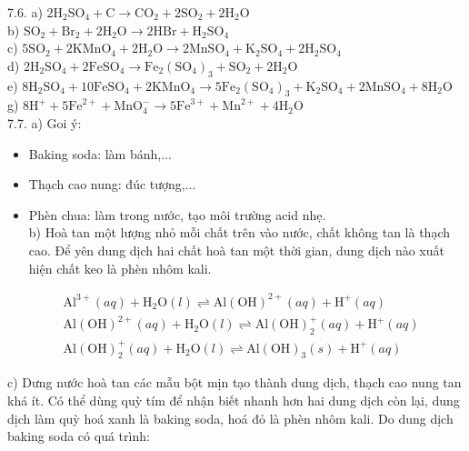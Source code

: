 \documentclass[10pt]{article}
\begin{document}
7.6. a) $2 \mathrm{H}_{2} \mathrm{SO}_{4}+\mathrm{C} \rightarrow \mathrm{CO}_{2}+2 \mathrm{SO}_{2}+2 \mathrm{H}_{2} \mathrm{O}$\\
b) $\mathrm{SO}_{2}+\mathrm{Br}_{2}+2 \mathrm{H}_{2} \mathrm{O} \rightarrow 2 \mathrm{HBr}+\mathrm{H}_{2} \mathrm{SO}_{4}$\\
c) $5 \mathrm{SO}_{2}+2 \mathrm{KMnO}_{4}+2 \mathrm{H}_{2} \mathrm{O} \rightarrow 2 \mathrm{MnSO}_{4}+\mathrm{K}_{2} \mathrm{SO}_{4}+2 \mathrm{H}_{2} \mathrm{SO}_{4}$\\
d) $2 \mathrm{H}_{2} \mathrm{SO}_{4}+2 \mathrm{FeSO}_{4} \rightarrow \mathrm{Fe}_{2}\left(\mathrm{SO}_{4}\right)_{3}+\mathrm{SO}_{2}+2 \mathrm{H}_{2} \mathrm{O}$\\
e) $8 \mathrm{H}_{2} \mathrm{SO}_{4}+10 \mathrm{FeSO}_{4}+2 \mathrm{KMnO}_{4} \rightarrow 5 \mathrm{Fe}_{2}\left(\mathrm{SO}_{4}\right)_{3}+\mathrm{K}_{2} \mathrm{SO}_{4}+2 \mathrm{MnSO}_{4}+8 \mathrm{H}_{2} \mathrm{O}$\\
g) $8 \mathrm{H}^{+}+5 \mathrm{Fe}^{2+}+\mathrm{MnO}_{4}^{-} \rightarrow 5 \mathrm{Fe}^{3+}+\mathrm{Mn}^{2+}+4 \mathrm{H}_{2} \mathrm{O}$\\
7.7. a) Goi ý:

\begin{itemize}
  \item Baking soda: làm bánh,...
  \item Thạch cao nung: đúc tượng,...
  \item Phèn chua: làm trong nước, tạo môi trường acid nhẹ.\\
b) Hoà tan một lượng nhỏ mỗi chất trên vào nước, chất không tan là thạch cao. Để yên dung dịch hai chất hoà tan một thời gian, dung dịch nào xuất hiện chất keo là phèn nhôm kali.
\end{itemize}

$$
\begin{aligned}
& \mathrm{Al}^{3+}(a q)+\mathrm{H}_{2} \mathrm{O}(l) \rightleftharpoons \mathrm{Al}(\mathrm{OH})^{2+}(a q)+\mathrm{H}^{+}(a q) \\
& \mathrm{Al}(\mathrm{OH})^{2+}(a q)+\mathrm{H}_{2} \mathrm{O}(l) \rightleftharpoons \mathrm{Al}(\mathrm{OH})_{2}^{+}(a q)+\mathrm{H}^{+}(a q) \\
& \mathrm{Al}(\mathrm{OH})_{2}^{+}(a q)+\mathrm{H}_{2} \mathrm{O}(l) \rightleftharpoons \mathrm{Al}(\mathrm{OH})_{3}(s)+\mathrm{H}^{+}(a q)
\end{aligned}
$$

c) Dưng nước hoà tan các mẫu bột mịn tạo thành dung dịch, thạch cao nung tan khá ít. Có thể dùng quỳ tím để nhận biết nhanh hơn hai dung dịch còn lại, dung dịch làm quỳ hoá xanh là baking soda, hoá đỏ là phèn nhôm kali. Do dung dịch baking soda có quá trình:
\end{document}
